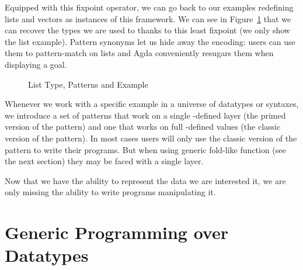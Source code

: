 Equipped with this fixpoint operator, we can go back to our examples
redefining lists and vectors as instances of this framework. We can
see in Figure~\ref{figure:listpat} that we can recover the types we are
used to thanks to this least fixpoint (we only show the list example).
%
Pattern synonyms let us hide away the encoding: users can use them
to pattern-match on lists and Agda conveniently resugars them when
displaying a goal.

\begin{figure}[h]
\begin{minipage}{0.5\textwidth}
\end{minipage}\begin{minipage}{0.5\textwidth}
\end{minipage}

\begin{minipage}{0.5\textwidth}
\end{minipage}\begin{minipage}{0.5\textwidth}
\end{minipage}
\caption{List Type, Patterns and Example}\label{figure:listpat}
\end{figure}

\begin{convention}
Whenever we work with a specific example in a universe of datatypes or
syntaxes, we introduce a set of patterns that work on a single
-defined layer (the primed version of the pattern) and
one that works on full -defined values (the classic version
of the pattern).
In most cases users will only use the classic version of the pattern
to write their programs. But when using generic fold-like function
(see the next section) they may be faced with a single layer.
\end{convention}

Now that we have the ability to represent the data we are interested it,
we are only missing the ability to write programs manipulating it.

\section{Generic Programming over Datatypes}

